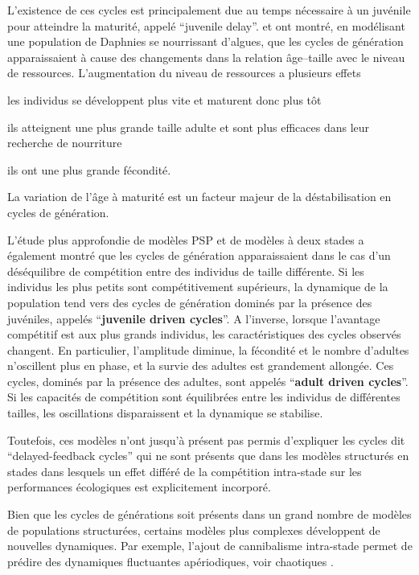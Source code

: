 L'existence de ces cycles est principalement due au temps nécessaire à
un juvénile pour atteindre la maturité, appelé ``juvenile delay''.
\textcite{de-roos1990a} et \textcite{de-roos1997a} ont montré, en modélisant une
population de Daphnies se nourrissant d'algues, que les cycles de génération
apparaissaient à cause des changements dans la relation âge--taille avec
le niveau de ressources. L'augmentation du niveau de ressources a plusieurs
effets \begin{enumerate*}[label=(\roman*), before=\unskip{ : }, itemjoin={{ ; }},
itemjoin*={{ ; et }}]\item les individus se développent plus vite et maturent
donc plus tôt \item ils atteignent une plus grande taille adulte et sont plus
efficaces dans leur recherche de nourriture \item ils ont une plus grande
fécondité.\end{enumerate*} La variation de l'âge à maturité est un facteur
majeur de la déstabilisation en cycles de génération.

\label{competPopStru}L'étude plus approfondie de modèles PSP et de modèles à
deux stades \autocite[juvéniles et adultes, ][]{de-roos2003a} a également montré que les
cycles de génération apparaissaient dans le cas d'un déséquilibre de compétition
entre des individus de taille différente. Si les individus les plus petits sont
compétitivement supérieurs, la dynamique de la population tend vers des cycles
de génération dominés par la présence des juvéniles, appelés ``\textbf{juvenile
driven cycles}''. A l'inverse, lorsque l'avantage compétitif est aux plus grands
individus, les caractéristiques des cycles observés changent.
En particulier, l'amplitude diminue, la fécondité et le nombre d'adultes
n'oscillent plus en phase, et la survie des adultes est grandement allongée. Ces
cycles, dominés par la présence des adultes, sont appelés ``\textbf{adult driven
cycles}''.
Si les capacités de compétition sont équilibrées entre les individus de
différentes tailles, les oscillations disparaissent et la dynamique se
stabilise. 

Toutefois, ces modèles n'ont jusqu'à présent pas permis d'expliquer
les cycles dit ``delayed-feedback cycles'' qui ne sont présents que dans les
modèles structurés en stades dans lesquels un effet différé de la compétition
intra-stade sur les performances écologiques est explicitement incorporé.

Bien que les cycles de générations soit présents dans un grand nombre de modèles
de populations structurées, certains modèles plus complexes développent de
nouvelles dynamiques. Par exemple, l'ajout de cannibalisme intra-stade permet de
prédire des dynamiques fluctuantes apériodiques, voir chaotiques
\autocites{costantino1997a,dennis1997a}.

